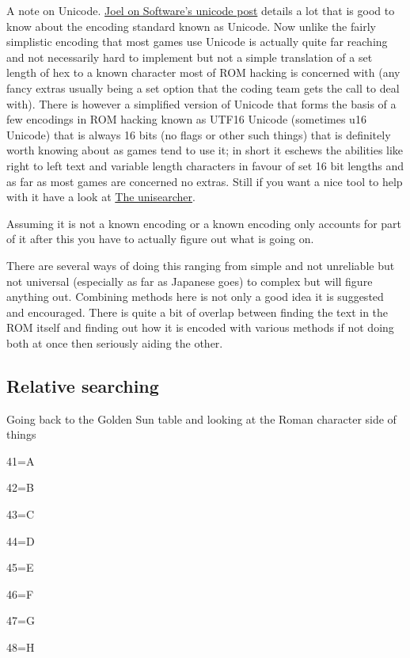 \documentclass[
]{book}
\begin{document}
A note on Unicode. \href{http://www.joelonsoftware.com/articles/Unicode.html}{Joel on Software's unicode post} details a lot that is good to know about the encoding standard known as Unicode. Now unlike the fairly simplistic encoding that most games use Unicode is actually quite far reaching and not necessarily hard to implement but not a simple translation of a set length of hex to a known character most of ROM hacking is concerned with (any fancy extras usually being a set option that the coding team gets the call to deal with). There is however a simplified version of Unicode that forms the basis of a few encodings in ROM hacking known as UTF16 Unicode (sometimes u16 Unicode) that is always 16 bits (no flags or other such things) that is definitely worth knowing about as games tend to use it; in short it eschews the abilities like right to left text and variable length characters in favour of set 16 bit lengths and as far as most games are concerned no extras. Still if you want a nice tool to help with it have a look at \href{http://www.isthisthingon.org/unicode/index.phtml}{The unisearcher}.

Assuming it is not a known encoding or a known encoding only accounts for part of it after this you have to actually figure out what is going on.

There are several ways of doing this ranging from simple and not unreliable but not universal (especially as far as Japanese goes) to complex but will figure anything out. Combining methods here is not only a good idea it is suggested and encouraged. There is quite a bit of overlap between finding the text in the ROM itself and finding out how it is encoded with various methods if not doing both at once then seriously aiding the other.

\hypertarget{relative-searching}{%
\subsection{Relative searching}\label{relative-searching}}

Going back to the Golden Sun table and looking at the Roman character side of things

41=A

42=B

43=C

44=D

45=E

46=F

47=G

48=H
\end{document}
